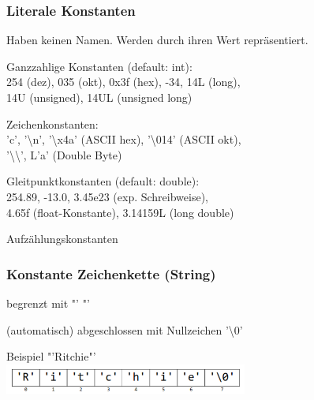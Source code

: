 		 	\begin{minipage}[t]{9 cm}
 				\subsubsection{Literale Konstanten}
 					Haben keinen Namen. Werden durch ihren Wert repräsentiert.
 					\begin{compactitem}
	 					\item Ganzzahlige Konstanten (default: int):\\
	 					254 (dez), 035 (okt), 0x3f (hex), -34, 14L (long),\\ 14U (unsigned), 14UL (unsigned long)
	 					\item Zeichenkonstanten:\\
	 					'c', '\textbackslash n', '\textbackslash x4a' (ASCII hex), '\textbackslash014' (ASCII okt), \\'\textbackslash \textbackslash', L'a' (Double Byte)
	 					\item Gleitpunktkonstanten (default: double):\\
	 					254.89, -13.0, 3.45e23 (exp. Schreibweise), \\ 4.65f (float-Konstante),  3.14159L (long double)
	 					\item Aufzählungskonstanten		 				 			 	
 					\end{compactitem}
 			\end{minipage}
 		\subsubsection{Konstante Zeichenkette (String)}
 			\begin{minipage}[t]{9 cm}
 				\begin{compactitem}
 					\item begrenzt mit "'  "'
 					\item (automatisch) abgeschlossen mit Nullzeichen '\textbackslash0'
 				\end{compactitem}	
 			\end{minipage}
 			\hspace*{0.5cm}
 			\begin{minipage}[t]{9 cm}
 				Beispiel "'Ritchie"'\\
 				\includegraphics[width=0.6\textwidth]{pics/Zeichenkonstante.png}
 			\end{minipage}
